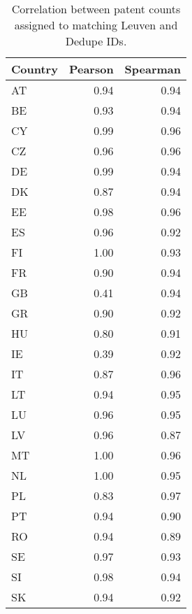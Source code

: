 \begin{table}[ht]
\centering
\begin{tabular}{lrr}
  \hline
Country & Pearson & Spearman \\ 
  \hline
AT & 0.94 & 0.94 \\ 
  BE & 0.93 & 0.94 \\ 
  CY & 0.99 & 0.96 \\ 
  CZ & 0.96 & 0.96 \\ 
  DE & 0.99 & 0.94 \\ 
  DK & 0.87 & 0.94 \\ 
  EE & 0.98 & 0.96 \\ 
  ES & 0.96 & 0.92 \\ 
  FI & 1.00 & 0.93 \\ 
  FR & 0.90 & 0.94 \\ 
  GB & 0.41 & 0.94 \\ 
  GR & 0.90 & 0.92 \\ 
  HU & 0.80 & 0.91 \\ 
  IE & 0.39 & 0.92 \\ 
  IT & 0.87 & 0.96 \\ 
  LT & 0.94 & 0.95 \\ 
  LU & 0.96 & 0.95 \\ 
  LV & 0.96 & 0.87 \\ 
  MT & 1.00 & 0.96 \\ 
  NL & 1.00 & 0.95 \\ 
  PL & 0.83 & 0.97 \\ 
  PT & 0.94 & 0.90 \\ 
  RO & 0.94 & 0.89 \\ 
  SE & 0.97 & 0.93 \\ 
  SI & 0.98 & 0.94 \\ 
  SK & 0.94 & 0.92 \\ 
   \hline
\end{tabular}
\caption{Correlation between patent counts assigned to matching Leuven and Dedupe IDs.} 
\label{tab:patent_count_corr}
\end{table}
